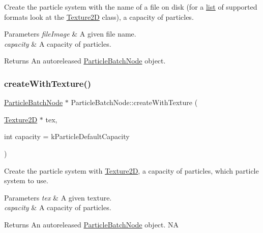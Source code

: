 Create the particle system with the name of a file on disk (for a \hyperlink{protocollist-p}{list} of supported formats look at the \hyperlink{classTexture2D}{Texture2D} class), a capacity of particles.


\begin{DoxyParams}{Parameters}
{\em file\+Image} & A given file name. \\
\hline
{\em capacity} & A capacity of particles. \\
\hline
\end{DoxyParams}
\begin{DoxyReturn}{Returns}
An autoreleased \hyperlink{classParticleBatchNode}{Particle\+Batch\+Node} object. 
\end{DoxyReturn}
\mbox{\label{classParticleBatchNode_a83d934d32153880237155f9f4e1789bf}} 
\subsubsection{\texorpdfstring{create\+With\+Texture()}{createWithTexture()}\hspace{0.1cm}{\footnotesize\ttfamily [1/2]}}
{\footnotesize\ttfamily \hyperlink{classParticleBatchNode}{Particle\+Batch\+Node} $\ast$ Particle\+Batch\+Node\+::create\+With\+Texture (\begin{DoxyParamCaption}\item[{\hyperlink{classTexture2D}{Texture2D} $\ast$}]{tex,  }\item[{int}]{capacity = {\ttfamily kParticleDefaultCapacity} }\end{DoxyParamCaption})\hspace{0.3cm}{\ttfamily [static]}}

Create the particle system with \hyperlink{classTexture2D}{Texture2D}, a capacity of particles, which particle system to use.


\begin{DoxyParams}{Parameters}
{\em tex} & A given texture. \\
\hline
{\em capacity} & A capacity of particles. \\
\hline
\end{DoxyParams}
\begin{DoxyReturn}{Returns}
An autoreleased \hyperlink{classParticleBatchNode}{Particle\+Batch\+Node} object.  NA 
\end{DoxyReturn}
\mbox{\label{classParticleBatchNode_a269188f999cb5ecad769942c547e2465}} 
